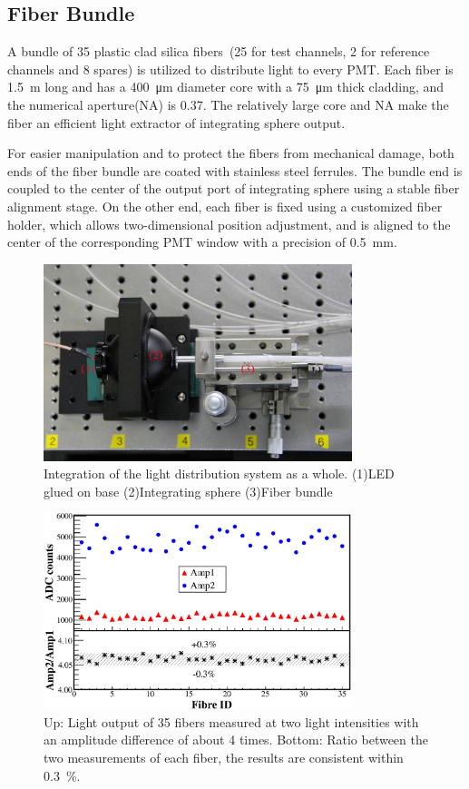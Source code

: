 \documentclass[review, times]{elsarticle}
\begin{document}
\subsection{Fiber Bundle}
\label{sec:fiber_bundle}

A bundle of 35 plastic clad silica fibers~\cite{optical_fibre}(25 for test channels, 2 for reference channels and 8 spares) is utilized to distribute light to every PMT.
Each fiber is \SI{1.5}{\meter} long and has a \SI{400}{\micro\meter} diameter core with a \SI{75}{\micro\meter} thick cladding, and the numerical aperture(NA) is 0.37.
The relatively large core and NA make the fiber an efficient light extractor of integrating sphere output. 

For easier manipulation and to protect the fibers from mechanical damage, both ends of the fiber bundle are coated with stainless steel ferrules.
The bundle end is coupled to the center of the output port of integrating sphere using a stable fiber alignment stage.
On the other end, each fiber is fixed using a customized fiber holder, which allows two-dimensional position adjustment, and is aligned to the center of the corresponding PMT window with a precision of \SI{0.5}{\milli\meter}.

\begin{figure}
 \centering
 \includegraphics[width=90mm]{FIG4}
\caption{Integration of the light distribution system as a whole.
(1)LED glued on base (2)Integrating sphere (3)Fiber bundle}
\label{fig:FIG4}
\end{figure} 

\begin{figure}
 \centering
 \includegraphics[width=90mm]{FIG5}
\caption{Up: Light output of 35 fibers measured at two light intensities with an amplitude difference of about 4 times.
Bottom: Ratio between the two measurements of each fiber, the results are consistent within \textpm\SI{0.3}{\percent}.}
\label{fig:FIG5}
\end{figure} 
\end{document}

